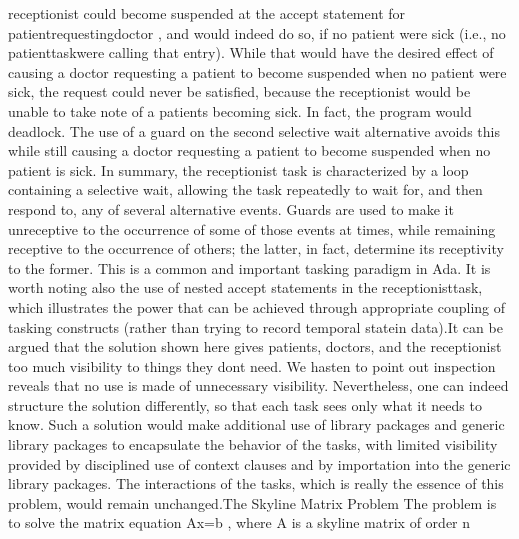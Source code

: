 receptionist could become suspended at the accept statement for %
\tyxffmxmono[]patient\Symuns[]requesting\Symuns[]doctor%
\tyxffmxendmono[], and would indeed do so, if no patient were sick
(i.e., no \tyxffmxmono[]patient\Symuns[]task\tyxffmxendmono[] were
calling that entry). While that would have the desired effect of causing
a doctor requesting a patient to become suspended when no patient
were sick, the request could never be satisfied, because the receptionist
would be unable to take note of a patient\rsquo[]s becoming sick.
In fact, the program would deadlock. The use of a guard on the second
selective wait alternative avoids this while still causing a doctor
requesting a patient to become suspended when no patient is sick.%
\Endpara[]
\Para[]In summary, the \tyxffmxmono[]receptionist%
\tyxffmxendmono[] task is characterized by a loop containing a selective
wait, allowing the task repeatedly to wait for, and then respond to,
any of several alternative events. Guards are used to make it unreceptive
to the occurrence of some of those events at times, while remaining
receptive to the occurrence of others; the latter, in fact, determine
its receptivity to the former. This is a common and important tasking
paradigm in Ada. It is worth noting also the use of nested accept
statements in the \tyxffmxmono[]receptionist\tyxffmxendmono[] task,
which illustrates the power that can be achieved through appropriate
coupling of tasking constructs (rather than trying to record temporal
\ldquo[]state\rdquo[] in data).\Endpara[]
\Para[]It can be argued that the solution shown here gives patients,
doctors, and the receptionist too much visibility to things they don\rsquo[]t
need. We hasten to point out inspection reveals that no use is made
of unnecessary visibility. Nevertheless, one can indeed structure
the solution differently, so that each task sees \txtxemph[]only%
\txtxendemph[] what it needs to know. Such a solution would make additional
use of library packages and generic library packages to encapsulate
the behavior of the tasks, with limited visibility provided by disciplined
use of context clauses and by importation into the generic library
packages. The interactions of the tasks, which is really the essence
of this problem, would remain unchanged.\Endpara[]
\DivEndiv[]
\DivEndiii[]
\HdMjLiii[]The Skyline Matrix Problem%
\HdMjEndiii[]
\Para[]The problem is to solve the matrix equation \InlEqn[]\LmthEqn[]Ax=b
\LmthEndeqn[]%
\EndInlEqn[], where \InlEqn[]\LmthEqn[]A
\LmthEndeqn[]\EndInlEqn[] is a skyline matrix of order
\InlEqn[]\LmthEqn[]n
